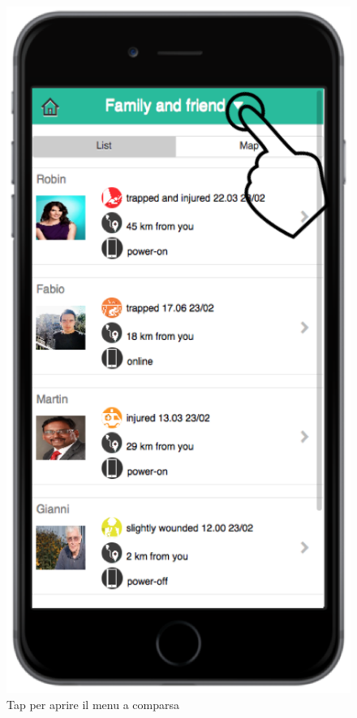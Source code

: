 \begin{itemize}
\begin{figure}[H]
	\centering
	\includegraphics[scale=1]{interfaccia/comparsa.png}
	\caption{Tap per aprire il menu a comparsa }
	\label{fig:comparsa}
\end{figure}
\begin{figure}[H]
	\centering

\end{figure}
\end{itemize}
